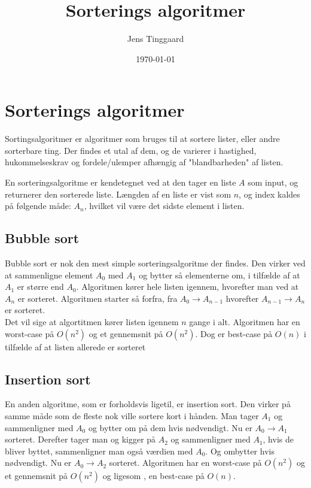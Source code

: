 \documentclass[12pt]{article}
\date{\today}
\title{Sorterings algoritmer}
\author{Jens Tinggaard}
\begin{document}
    \maketitle

    {\large\tableofcontents}
    \newpage



    \section{Sorterings algoritmer}
    Sortingsalgoritmer er algoritmer som bruges til at sortere lister, eller andre sorterbare ting.
    Der findes et utal af dem, og de varierer i hastighed, hukommelseskrav og fordele/ulemper afhængig af "blandbarheden" af listen.

    En sorteringsalgoritme er kendetegnet ved at den tager en liste $A$ som input, og returnerer den sorterede liste. Længden af en liste er vist som $n$, og index kaldes på  følgende måde: $A_n$, hvilket vil være det sidste element i listen.


        \subsection{Bubble sort}
        \label{sub:bubblesort}
        Bubble sort er nok den mest simple sorteringsalgoritme der findes.
        Den virker ved at sammenligne element $A_0$ med $A_1$ og bytter så elementerne om, i tilfælde af at $A_1$ er større end $A_0$.
        Algoritmen kører hele listen igennem, hvorefter man ved at $A_n$ er sorteret.
        Algoritmen starter så forfra, fra $A_0 \to A_{n-1}$ hvorefter $A_{n-1} \to A_n$ er sorteret.\\
        Det vil sige at algortitmen kører listen igennem $n$ gange i alt.
        Algoritmen har en worst-case på $O(n^2)$ og et gennemsnit på $O(n^2)$. Dog er best-case på $O(n)$ i tilfælde af at listen allerede er sorteret


        \subsection{Insertion sort}
        En anden algoritme, som er forholdsvis ligetil, er insertion sort. Den virker på samme måde som de fleste nok ville sortere kort i hånden.
        Man tager $A_1$ og sammenligner med $A_0$ og bytter om på dem hvis nødvendigt. Nu er $A_0 \to A_{1}$ sorteret.
        Derefter tager man og kigger på $A_2$ og sammenligner med $A_1$, hvis de bliver byttet, sammenligner man også værdien med $A_0$. Og ombytter hvis nødvendigt.
        Nu er $A_0 \to A_2$ sorteret.
        Algoritmen har en worst-case på $O(n^2)$ og et gennemsnit på $O(n^2)$ og ligesom , en best-case på $O(n)$.
\end{document}
